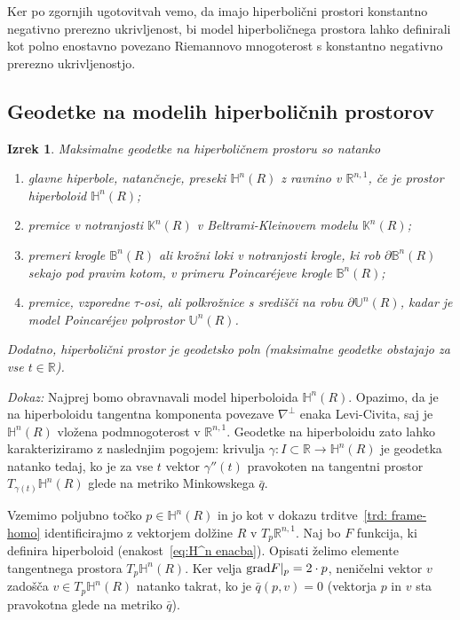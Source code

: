 \documentclass[a4paper]{article}
\newtheorem{izrek}{Izrek}
\begin{document}
Ker po zgornjih ugotovitvah vemo, da imajo hiperbolični prostori konstantno negativno prerezno ukrivljenost, bi model hiperboličnega prostora lahko definirali kot polno enostavno povezano Riemannovo mnogoterost s konstantno negativno prerezno ukrivljenostjo.

\subsection{Geodetke na modelih hiperboličnih prostorov}

\begin{izrek}
Maksimalne geodetke na hiperboličnem prostoru so natanko
\begin{enumerate}
\item glavne hiperbole, natančneje, preseki $\mathbb{H}^{n}(R)$ z ravnino v $\mathbb{R}^{n,1}$, če je prostor \textup{hiperboloid} $\mathbb{H}^{n}(R)$;
%
\item premice v notranjosti $\mathbb{K}^{n}(R)$ v \textup{Beltrami-Kleinovem modelu} $\mathbb{K}^{n}(R)$;
%
\item premeri krogle $\mathbb{B}^{n}(R)$ ali krožni loki v notranjosti krogle, ki rob $\partial\mathbb{B}^{n}(R)$ sekajo pod pravim kotom, v primeru \textup{Poincar\'ejeve krogle} $\mathbb{B}^{n}(R)$;
%
\item premice, vzporedne $\tau$-osi, ali polkrožnice s središči na robu $\partial\mathbb{U}^{n}(R)$, kadar je model \textup{Poincar\'ejev polprostor} $\mathbb{U}^{n}(R)$.
\end{enumerate}
Dodatno, hiperbolični prostor je geodetsko poln (maksimalne geodetke obstajajo za vse $t \in \mathbb{R}$).
\end{izrek}

\noindent
{\em Dokaz:\/}
Najprej bomo obravnavali model hiperboloida $\mathbb{H}^{n}(R)$.
Opazimo, da je na hiperboloidu tangentna komponenta povezave $\nabla^{\perp}$ enaka Levi-Civita, saj je $\mathbb{H}^{n}(R)$ vložena podmnogoterost v $\mathbb{R}^{n,1}$.
Geodetke na hiperboloidu zato lahko karakteriziramo z naslednjim pogojem: krivulja $\gamma \colon I \subset \mathbb{R} \to \mathbb{H}^{n}(R)$ je geodetka natanko tedaj, ko je za vse $t$ vektor $\gamma''(t)$ pravokoten na tangentni prostor $T_{\gamma(t)}\mathbb{H}^{n}(R)$ glede na metriko Minkowskega $\bar{q}$.

Vzemimo poljubno točko $p \in \mathbb{H}^{n}(R)$ in jo kot v dokazu trditve~\ref{trd: frame-homo} identificirajmo z vektorjem dolžine $R$ v $T_{p}\mathbb{R}^{n,1}$. Naj bo $F$ funkcija, ki definira hiperboloid (enakost~\ref{eq:H^n enacba}).
Opisati želimo elemente tangentnega prostora $T_{p}\mathbb{H}^{n}(R)$. Ker velja $\textup{grad}F|_{p}=2\cdot p$, neničelni vektor $v$ zadošča $v \in T_{p}\mathbb{H}^{n}(R)$ natanko takrat, ko je $\bar{q}(p,v)=0$ (vektorja $p$ in $v$ sta pravokotna glede na metriko $\bar{q}$).
\end{document}
